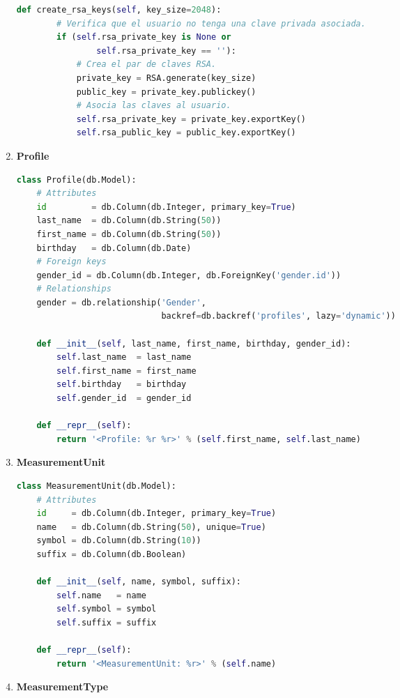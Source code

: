 \begin{enumerate}
\begin{lstlisting}[language=Python]
    def create_rsa_keys(self, key_size=2048):
        # Verifica que el usuario no tenga una clave privada asociada.
        if (self.rsa_private_key is None or
                self.rsa_private_key == ''):
            # Crea el par de claves RSA.
            private_key = RSA.generate(key_size)
            public_key = private_key.publickey()
            # Asocia las claves al usuario.
            self.rsa_private_key = private_key.exportKey()
            self.rsa_public_key = public_key.exportKey()
\end{lstlisting}
	
	\item \textbf{Profile}
	
\begin{lstlisting}[language=Python]
class Profile(db.Model):
    # Attributes
    id         = db.Column(db.Integer, primary_key=True)
    last_name  = db.Column(db.String(50))
    first_name = db.Column(db.String(50))
    birthday   = db.Column(db.Date)
    # Foreign keys
    gender_id = db.Column(db.Integer, db.ForeignKey('gender.id'))
    # Relationships
    gender = db.relationship('Gender',
                             backref=db.backref('profiles', lazy='dynamic'))

    def __init__(self, last_name, first_name, birthday, gender_id):
        self.last_name  = last_name
        self.first_name = first_name
        self.birthday   = birthday
        self.gender_id  = gender_id

    def __repr__(self):
        return '<Profile: %r %r>' % (self.first_name, self.last_name)
\end{lstlisting}
	
\item \textbf{MeasurementUnit}
	
\begin{lstlisting}[language=Python]
class MeasurementUnit(db.Model):
    # Attributes
    id     = db.Column(db.Integer, primary_key=True)
    name   = db.Column(db.String(50), unique=True)
    symbol = db.Column(db.String(10))
    suffix = db.Column(db.Boolean)

    def __init__(self, name, symbol, suffix):
        self.name   = name
        self.symbol = symbol
        self.suffix = suffix

    def __repr__(self):
        return '<MeasurementUnit: %r>' % (self.name)
\end{lstlisting}
	
\item \textbf{MeasurementType}
	

\end{enumerate}
